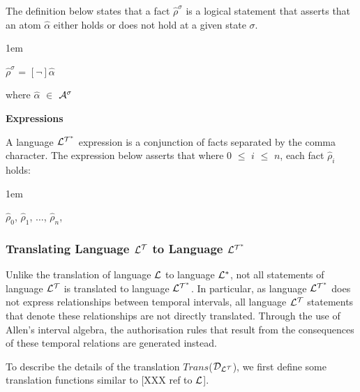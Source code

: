 \documentclass[11pt]{report}
\newenvironment{vquote}
{
  \begin{list}{}{\leftmargin 1em}\item[]
}
{
  \end{list}
}
\begin{document}
\begin{itemize}
              The definition below states that a fact $\hat{\rho}^\sigma$ is a
              logical statement that asserts that an atom $\hat{\alpha}$ either
              holds or does not hold at a given state $\sigma$.

              \begin{vquote}
                $\hat{\rho}^{\sigma}$ =
                  $[\lnot]$$\hat{\alpha}$

                where
                $\hat{\alpha}$ $\in$ ${\cal A}^{\sigma}$
              \end{vquote}

            \item
              {\bf Expressions}

              A language ${\cal L^{T^*}}$ expression is a conjunction of
              facts separated by the comma character. The expression below
              asserts that where $0$ $\leq$ $i$ $\leq$ $n$, each fact
              $\hat{\rho}_i$ holds:

              \begin{vquote}
                $\hat{\rho}_0$,
                $\hat{\rho}_1$,
                $\ldots$,
                $\hat{\rho}_n$,
              \end{vquote}

          \end{itemize}

        \subsubsection{Translating Language ${\cal L^T}$ to Language ${\cal L^{T^*}}$}

          Unlike the translation of language ${\cal L}$ to language
          ${\cal L^*}$, not all statements of language ${\cal L^T}$ is
          translated to language ${\cal L^{T^*}}$. In particular, as language
          ${\cal L^{T^*}}$ does not express relationships between temporal
          intervals, all language ${\cal L^T}$ statements that denote these
          relationships are not directly translated. Through the use of Allen's
          interval algebra, the authorisation rules that result from the
          consequences of these temporal relations are generated instead.

          To describe the details of the translation $Trans$(${\cal D_{L^T}}$),
          we first define some translation functions similar to
          [XXX ref to ${\cal L}$].
\end{document}
